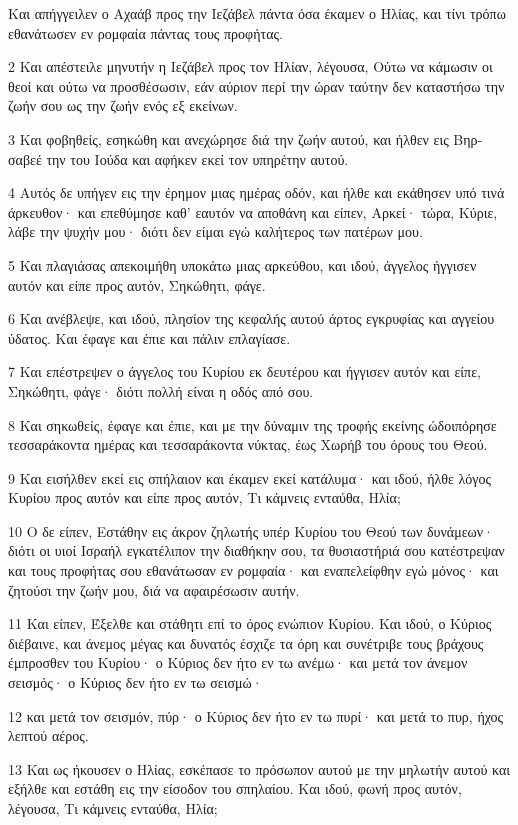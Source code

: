 \par Και απήγγειλεν ο Αχαάβ προς την Ιεζάβελ πάντα όσα έκαμεν ο Ηλίας, και τίνι τρόπω εθανάτωσεν εν ρομφαία πάντας τους προφήτας.
\par 2 Και απέστειλε μηνυτήν η Ιεζάβελ προς τον Ηλίαν, λέγουσα, Ούτω να κάμωσιν οι θεοί και ούτω να προσθέσωσιν, εάν αύριον περί την ώραν ταύτην δεν καταστήσω την ζωήν σου ως την ζωήν ενός εξ εκείνων.
\par 3 Και φοβηθείς, εσηκώθη και ανεχώρησε διά την ζωήν αυτού, και ήλθεν εις Βηρ-σαβεέ την του Ιούδα και αφήκεν εκεί τον υπηρέτην αυτού.
\par 4 Αυτός δε υπήγεν εις την έρημον μιας ημέρας οδόν, και ήλθε και εκάθησεν υπό τινά άρκευθον· και επεθύμησε καθ' εαυτόν να αποθάνη και είπεν, Αρκεί· τώρα, Κύριε, λάβε την ψυχήν μου· διότι δεν είμαι εγώ καλήτερος των πατέρων μου.
\par 5 Και πλαγιάσας απεκοιμήθη υποκάτω μιας αρκεύθου, και ιδού, άγγελος ήγγισεν αυτόν και είπε προς αυτόν, Σηκώθητι, φάγε.
\par 6 Και ανέβλεψε, και ιδού, πλησίον της κεφαλής αυτού άρτος εγκρυφίας και αγγείου ύδατος. Και έφαγε και έπιε και πάλιν επλαγίασε.
\par 7 Και επέστρεψεν ο άγγελος του Κυρίου εκ δευτέρου και ήγγισεν αυτόν και είπε, Σηκώθητι, φάγε· διότι πολλή είναι η οδός από σου.
\par 8 Και σηκωθείς, έφαγε και έπιε, και με την δύναμιν της τροφής εκείνης ώδοιπόρησε τεσσαράκοντα ημέρας και τεσσαράκοντα νύκτας, έως Χωρήβ του όρους του Θεού.
\par 9 Και εισήλθεν εκεί εις σπήλαιον και έκαμεν εκεί κατάλυμα· και ιδού, ήλθε λόγος Κυρίου προς αυτόν και είπε προς αυτόν, Τι κάμνεις ενταύθα, Ηλία;
\par 10 Ο δε είπεν, Εστάθην εις άκρον ζηλωτής υπέρ Κυρίου του Θεού των δυνάμεων· διότι οι υιοί Ισραήλ εγκατέλιπον την διαθήκην σου, τα θυσιαστήριά σου κατέστρεψαν και τους προφήτας σου εθανάτωσαν εν ρομφαία· και εναπελείφθην εγώ μόνος· και ζητούσι την ζωήν μου, διά να αφαιρέσωσιν αυτήν.
\par 11 Και είπεν, Έξελθε και στάθητι επί το όρος ενώπιον Κυρίου. Και ιδού, ο Κύριος διέβαινε, και άνεμος μέγας και δυνατός έσχιζε τα όρη και συνέτριβε τους βράχους έμπροσθεν του Κυρίου· ο Κύριος δεν ήτο εν τω ανέμω· και μετά τον άνεμον σεισμός· ο Κύριος δεν ήτο εν τω σεισμώ·
\par 12 και μετά τον σεισμόν, πύρ· ο Κύριος δεν ήτο εν τω πυρί· και μετά το πυρ, ήχος λεπτού αέρος.
\par 13 Και ως ήκουσεν ο Ηλίας, εσκέπασε το πρόσωπον αυτού με την μηλωτήν αυτού και εξήλθε και εστάθη εις την είσοδον του σπηλαίου. Και ιδού, φωνή προς αυτόν, λέγουσα, Τι κάμνεις ενταύθα, Ηλία;
